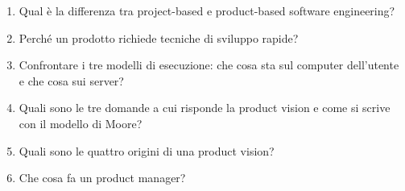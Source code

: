 \begin{domande}
\begin{enumerate}
  \item Qual è la differenza tra project-based e product-based software engineering?
  \item Perché un prodotto richiede tecniche di sviluppo rapide?
  \item Confrontare i tre modelli di esecuzione: che cosa sta sul computer dell'utente e che cosa sui server?
  \item Quali sono le tre domande a cui risponde la product vision e come si scrive con il modello di Moore?
  \item Quali sono le quattro origini di una product vision?
  \item Che cosa fa un product manager?
\end{enumerate}
\end{domande}
